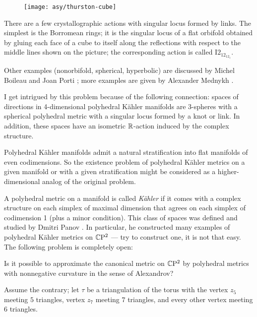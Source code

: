 \begin{wrapfigure}{r}{23 mm}
\vskip-4mm
\centering
\texttt{[image: asy/thurston-cube]}
\vskip-4mm
\end{wrapfigure}

There are a few crystallographic actions with singular locus formed by links. 
The simplest is the Borromean rings;
it is the singular locus of a flat orbifold obtained by gluing each face of a cube to itself
along the reflections with respect to the middle lines shown on the picture; the corresponding action is called I$2_12_12_1$. 

Other examples (nonorbifold, spherical, hyperbolic) are discussed by Michel Boileau and Joan Porti \cite[Chapter 9]{boileau-porti};
more examples are given by Alexander Mednykh \cite{mednykh}.

I get intrigued by this problem because of the following connection:
spaces of directions in 4-dimensional polyhedral Kähler manifolds
are 3-spheres with a spherical polyhedral metric with a singular locus formed by a knot or link.
In addition, these spaces have an isometric $\mathbb{R}$-action induced by the complex structure.

Polyhedral Kähler manifolds admit a natural stratification into flat manifolds of even codimensions.
So the existence problem of polyhedral Kähler metrics on a given manifold or with a given stratification might be considered as a higher-dimensional analog of the original problem.

A polyhedral metric on a manifold is called \emph{Kähler} if it comes with a complex structure on each simplex of maximal dimension that agrees on each simplex of codimension 1 (plus a minor condition).
This class of spaces was defined and studied by Dmitri Panov \cite{panov-Kaeler}.
In particular, he constructed many examples of polyhedral Kähler metrics on 
$\mathbb{C}\mathrm{P}^2$ ---
try to construct one, it is not that easy.
The following problem is completely open:

\begin{pr}
Is it possible to approximate the canonical metric on $\mathbb{C}\mathrm{P}^2$ by polyhedral metrics with nonnegative curvature in the sense of Alexandrov?
\end{pr}

Assume the contrary;
let $\tau$ be a triangulation of the torus with the vertex $z_5$ meeting $5$ triangles,
vertex $z_7$ meeting $7$ triangles, 
and every other vertex meeting $6$ triangles.

